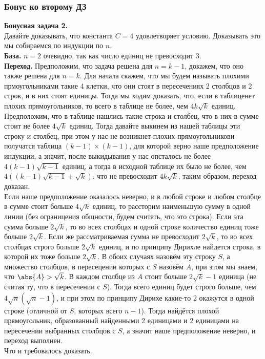 \subsubsection{Бонус ко второму ДЗ}

\textbf{Бонусная задача 2.}\\
Давайте доказывать, что константа $C=4$ удовлетворяет условию. Доказывать это мы собираемся по индукции по $n$.\\
\textbf{База.} $n=2$ очевидно, так как число единиц не превосходит 3.\\
\textbf{Переход.} Предположим, что задача решена для $n=k-1$, докажем, что оно также решена для $n=k$. Для начала скажем, что мы будем называть плохими прмоугольниками такие 4 клетки, что они стоят в пересечениях 2 столбцов и 2 строк, и в них стоят единицы. Тогда мы ходим доказать, что, если в таблиценет плохих прямоугольников, то всего в таблице не более, чем $4k\sqrt{k}$ единиц.\\
Предположим, что в таблице нашлись такие строка и столбец, что в них в сумме стоит не более $4\sqrt{k}$ единиц. Тогда давайте выкинем из нашей таблицы эти строку и столбец, при этом у нас не возникнет плохих прямоугольникови получатся таблица $(k-1) \times (k-1)$, для которой верно наше предположение индукции, а значит, после выкидывания у нас опсталось не более $4(k-1)\sqrt{k-1}$ единиц, а тогда в исходной таблице их было не более, чем $4((k-1)\sqrt{k-1} + \sqrt{k})$, что не превосходит $4k\sqrt{k}$, таким образом, переход доказан.\\
Если наше предположение оказалось неверно, и в любой строке и любом столбце в сумме стоит больше $4\sqrt{k}$ единиц, то рассторим наименьшую сумму в одной линии (без ограницения общности, будем считать, что это строка). Если эта сумма больше $2\sqrt{k}$, то во всех столбцах и одной строке количество единиц тоже больше $2\sqrt{k}$. Если же рассматриваемая сумма не превосходит $2\sqrt{k}$, то во всех столбцах строго больше $2\sqrt{k}$ единиц, и по принципу Дирихле найдется строка, в которой их тоже больше $2\sqrt{k}$. В обоих случаях назовём эту строку $S$, а множество столбцов, в пересецении которых с $S$ назовём $A$, при этом мы знаем, что $\abs{A} > \sqrt{k}$. В каждом столбце из $A$ стоит больше $2\sqrt{k} - 1$ единица (не считая ту, что в пересечении с $S$). Тогда всего единиц будет строго больше, чем $4\sqrt{n}(\sqrt{n}-1)$, и при этом по принципу Дирихе какие-то 2 окажутся в одной строке (отличной от $S$, которых всего $n-1$). Тогда найдётся плохой прямоугольник, образованный найденными 2 единицами и 2 единицами на пересечении выбранных столбцов с $S$, а значит наше предположение неверно, и переход выполнен.\\
Что и требовалось доказать.